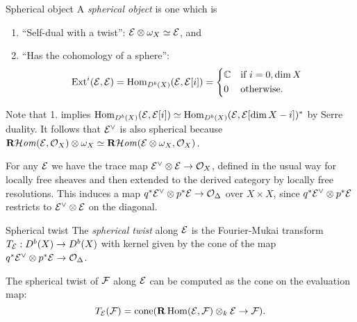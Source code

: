 \begin{definition}{Spherical object}{}
    A \emph{spherical object} is one which is
    \begin{enumerate}
        \item ``Self-dual with a twist'': $\mathcal{E}\otimes\omega_X\simeq\mathcal{E}$, and
        \item ``Has the cohomology of a sphere'':
            \begin{equation*}
                \Ext^i(\calE,\calE)
                    = \Hom_{D^b(X)}(\calE,\calE[i])
                    = \begin{cases*}
                        \C & if $i=0,\dim X$ \\
                        0 & otherwise.
                    \end{cases*}
            \end{equation*}
    \end{enumerate}
\end{definition}

Note that 1. implies $\operatorname{Hom}_{D^b(X)}(\mathcal{E},\mathcal{E}[i])\simeq\operatorname{Hom}_{D^b(X)}(\mathcal{E},\mathcal{E}[\dim X-i])^*$
by Serre duality. It follows that $\mathcal{E}^\vee$ is also spherical because
$\operatorname{\mathbf{R}\mathcal{H}\mathit{om}}(\mathcal{E},\mathcal{O}_X)\otimes\omega_X\simeq\operatorname{\mathbf{R}\mathcal{H}\mathit{om}}(\mathcal{E}\otimes\omega_X,\mathcal{O}_X)$.

For any $\mathcal{E}$ we have the trace map $\mathcal{E}^\vee\otimes\mathcal{E}\to\mathcal{O}_X$, defined
in the usual way for locally free sheaves and then extended to the derived
category by locally free resolutions. This induces a map
$q^*\mathcal{E}^\vee\otimes p^*\mathcal{E}\to\mathcal{O}_\Delta$ over $X\times X$, since
$q^*\mathcal{E}^\vee\otimes p^*\mathcal{E}$ restricts to $\mathcal{E}^\vee\otimes\mathcal{E}$ on the
diagonal.

\begin{definition}{Spherical twist}{}
    The \emph{spherical twist} along $\mathcal{E}$ is the Fourier-Mukai transform
    $T_{\mathcal{E}}:D^b(X)\to D^b(X)$ with kernel given by the cone of the map
    $q^*\mathcal{E}^\vee\otimes p^*\mathcal{E}\to\mathcal{O}_\Delta$.
\end{definition}

\begin{proposition}[label=prop:twistformula]{}{}
    The spherical twist of $\mathcal{F}$ along $\mathcal{E}$ can be computed as the cone on
    the evaluation map:
    \begin{equation}\label{eqn:twistformula}
        T_{\mathcal{E}}(\mathcal{F})=\operatorname{cone}(\mathbf{R}\operatorname{Hom}(\mathcal{E},\mathcal{F})\otimes_k\mathcal{E}\to\mathcal{F}).
    \end{equation}
\end{proposition}

